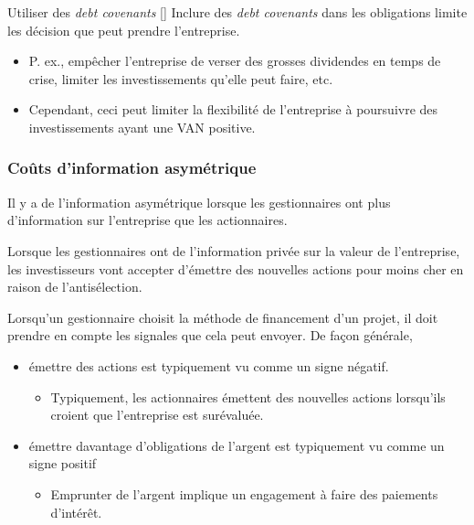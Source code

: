 \documentclass[10pt, french]{article}
\begin{document}
\begin{multicols*}{2}
\begin{definitionGENERAL}{Utiliser des \og \textit{debt covenants} \fg{}}[]
Inclure des \og \textit{debt covenants} \fg{} dans les obligations limite les décision que peut prendre l'entreprise.
\begin{itemize}
	\item	P. ex., empêcher l'entreprise de verser des grosses dividendes en temps de crise, limiter les investissements qu'elle peut faire, etc.
	\item	Cependant, ceci peut limiter la flexibilité de l'entreprise à poursuivre des investissements ayant une VAN positive.
\end{itemize}
\end{definitionGENERAL}


\columnbreak
\subsubsection{Coûts d'information asymétrique}
\begin{definitionNOHFILL}
Il y a de l'information asymétrique lorsque les gestionnaires ont plus d'information sur l'entreprise que les actionnaires.
\end{definitionNOHFILL}

\begin{definitionNOHFILLsub}
Lorsque les gestionnaires ont de l'information privée sur la valeur de l'entreprise, les investisseurs vont accepter d'émettre des nouvelles actions pour moins cher en raison de l'antisélection.
\end{definitionNOHFILLsub}

Lorsqu'un gestionnaire choisit la méthode de financement d'un projet, il doit prendre en compte les signales que cela peut envoyer. De façon générale, 
\begin{itemize}
	\item	émettre des actions est typiquement vu comme un signe négatif.
		\begin{itemize}
		\item	Typiquement, les actionnaires émettent des nouvelles actions lorsqu'ils croient que l'entreprise est surévaluée. 
		\end{itemize}
	\item	émettre davantage d'obligations de l'argent est typiquement vu comme un signe positif
		\begin{itemize}
		\item	Emprunter de l'argent implique un engagement à faire des paiements d'intérêt.
		\end{itemize}
\end{itemize}


\end{multicols*}
\end{document}
